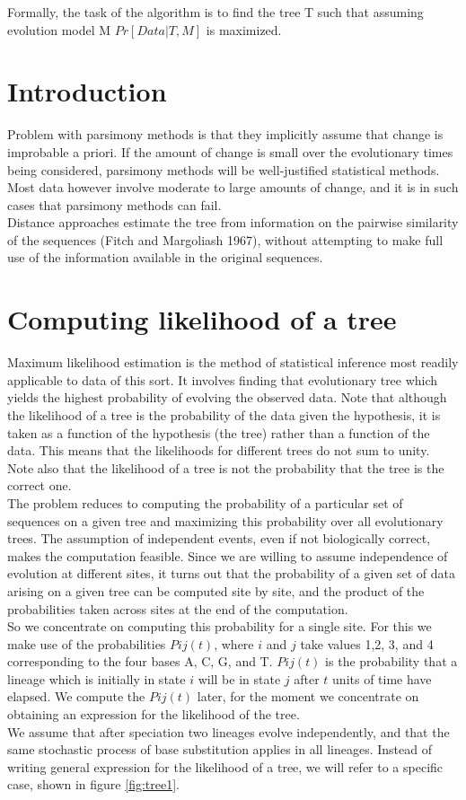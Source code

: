 Formally, the task of the algorithm is to find the tree T such that assuming evolution model M $Pr[Data| T,M]$ is maximized.

\section{Introduction}
Problem with parsimony methods is that they implicitly assume that change is improbable a priori. If the amount of change is small over the evolutionary times being considered, parsimony methods will be well-justified statistical methods.
Most data however involve moderate to large amounts of change, and it is in such cases that parsimony methods can fail.
\\
Distance approaches estimate the tree from information on the pairwise similarity of the sequences (Fitch and Margoliash 1967), without attempting to make full use of the information available in the original sequences.

\section{Computing likelihood of a tree }
Maximum likelihood estimation is the method of statistical inference most readily applicable to data of this sort. It involves finding that evolutionary tree which yields the highest probability of evolving the observed data.
Note that although the likelihood of a tree is the probability of the data given the hypothesis, it is taken as a function of the hypothesis (the tree) rather than a function of the data. This means that the likelihoods for different trees do not sum to unity.
Note also that the likelihood of a tree is not the probability that the tree is the correct one.
\\
The problem reduces to computing the probability of a particular set of sequences on a given tree and maximizing this probability over all evolutionary trees.
The assumption of independent events, even if not biologically correct, makes the computation feasible.
Since we are willing to assume independence of evolution at different sites, it turns out that the probability of a given set of data arising on a given tree can be computed site by site, and the product of the probabilities taken across sites at the end of the computation.
\\
So we concentrate on computing this probability for a single site.
For this we make use of the probabilities $Pij(t)$, where $i$ and $j$ take values 1,2, 3, and 4 corresponding to the four bases A, C, G, and T. $Pij(t)$ is the probability that a lineage which is initially in state $i$ will be in state $j$ after $t$ units of time have elapsed. We compute the $Pij(t)$ later, for the moment
we concentrate on obtaining an expression for the likelihood of the tree.
\\
We assume that after speciation two lineages evolve independently, and that the same stochastic process of base substitution applies in all lineages.
Instead of writing general expression for the likelihood of a tree, we will refer to a specific case, shown in figure \ref{fig:tree1}.

